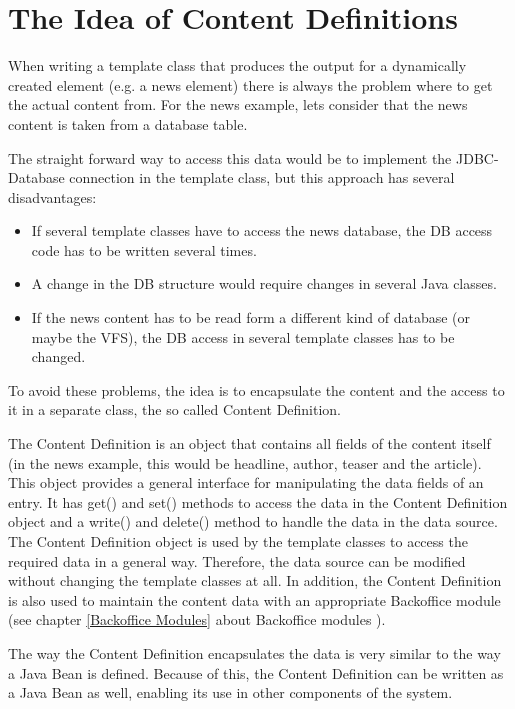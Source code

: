 \chapter{The Idea of Content Definitions}
When writing a template class that produces the output  for a
dynamically created element (e.g. a news element) there is always the
problem where to get the actual content from. For the news example, lets
consider that the news content is taken from a database table.

The straight forward way to access this data would be to implement the
JDBC-Database connection in the template class, but this approach has
several disadvantages:
\begin{itemize}
\item If several template classes have to access the news database,
the DB access code has to be written several times.
\item A change in the DB structure would require changes in several
Java classes.
\item If the news content has to be read form a different kind of
database (or maybe the VFS), the DB access in several template classes
has to be changed.
\end{itemize}

To avoid these problems, the idea is to encapsulate the content and
the access to it in a separate class, the so called Content Definition.

The Content Definition is an object that contains all fields of the
content itself (in the news example, this would be headline, author,
teaser and the article). This object provides a general interface for manipulating
the data fields of an entry. It has {\meth get()} and {\meth set()} methods to access the data 
in the Content Definition object and a {\meth write()} 
and {\meth delete()} method to handle the data in the data source.
The Content Definition object is used by the template classes to access 
the required data in a general way. 
Therefore, the data source can be modified without changing the template classes at all. 
In addition, the Content Definition is also used to maintain the content
data with an appropriate Backoffice module (see chapter \ref{Backoffice Modules}
about Backoffice modules ).

The way the Content Definition encapsulates the data is very similar to
the way a Java Bean is defined. Because of this, the Content Definition
can be written as a Java Bean as well, enabling its use in other
components of the system.

